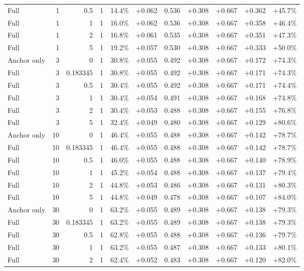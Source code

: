 \begin{table}[htbp]
\begin{tabular}{lrrrccccccc}
Full & 1 & 0.5 & 1 & 14.4\% & +0.062 & 0.536 & +0.308 & +0.667 & +0.362 & +45.7\% \\
Full & 1 & 1 & 1 & 16.0\% & +0.062 & 0.536 & +0.308 & +0.667 & +0.358 & +46.4\% \\
Full & 1 & 2 & 1 & 16.8\% & +0.061 & 0.535 & +0.308 & +0.667 & +0.351 & +47.3\% \\
Full & 1 & 5 & 1 & 19.2\% & +0.057 & 0.530 & +0.308 & +0.667 & +0.333 & +50.0\% \\
Anchor only & 3 & 0 & 1 & 30.8\% & +0.055 & 0.492 & +0.308 & +0.667 & +0.172 & +74.3\% \\
Full & 3 & 0.183345 & 1 & 30.8\% & +0.055 & 0.492 & +0.308 & +0.667 & +0.171 & +74.3\% \\
Full & 3 & 0.5 & 1 & 30.4\% & +0.055 & 0.492 & +0.308 & +0.667 & +0.171 & +74.4\% \\
Full & 3 & 1 & 1 & 30.4\% & +0.054 & 0.491 & +0.308 & +0.667 & +0.168 & +74.8\% \\
Full & 3 & 2 & 1 & 30.4\% & +0.053 & 0.488 & +0.308 & +0.667 & +0.155 & +76.8\% \\
Full & 3 & 5 & 1 & 32.4\% & +0.049 & 0.480 & +0.308 & +0.667 & +0.129 & +80.6\% \\
Anchor only & 10 & 0 & 1 & 46.4\% & +0.055 & 0.488 & +0.308 & +0.667 & +0.142 & +78.7\% \\
Full & 10 & 0.183345 & 1 & 46.4\% & +0.055 & 0.488 & +0.308 & +0.667 & +0.142 & +78.7\% \\
Full & 10 & 0.5 & 1 & 46.0\% & +0.055 & 0.488 & +0.308 & +0.667 & +0.140 & +78.9\% \\
Full & 10 & 1 & 1 & 45.2\% & +0.054 & 0.488 & +0.308 & +0.667 & +0.137 & +79.4\% \\
Full & 10 & 2 & 1 & 44.8\% & +0.053 & 0.486 & +0.308 & +0.667 & +0.131 & +80.3\% \\
Full & 10 & 5 & 1 & 44.8\% & +0.049 & 0.478 & +0.308 & +0.667 & +0.107 & +84.0\% \\
Anchor only & 30 & 0 & 1 & 63.2\% & +0.055 & 0.489 & +0.308 & +0.667 & +0.138 & +79.3\% \\
Full & 30 & 0.183345 & 1 & 63.2\% & +0.055 & 0.489 & +0.308 & +0.667 & +0.138 & +79.3\% \\
Full & 30 & 0.5 & 1 & 62.8\% & +0.055 & 0.488 & +0.308 & +0.667 & +0.136 & +79.7\% \\
Full & 30 & 1 & 1 & 63.2\% & +0.055 & 0.487 & +0.308 & +0.667 & +0.133 & +80.1\% \\
Full & 30 & 2 & 1 & 62.4\% & +0.052 & 0.483 & +0.308 & +0.667 & +0.120 & +82.0\% \\

\end{tabular}
\end{table}
